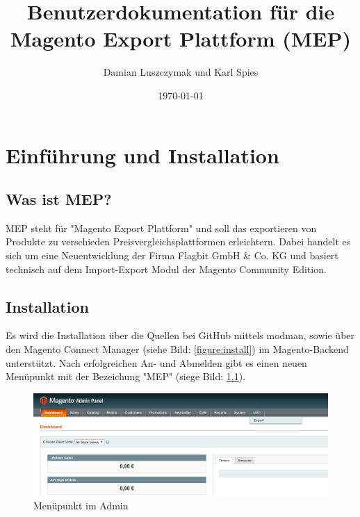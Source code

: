 \documentclass[a4paper,12pt]{book}
\author{Damian Luszczymak und Karl Spies}
\date{\today}
\title{Benutzerdokumentation für die Magento Export Plattform (MEP)}
\begin{document}
\maketitle

\tableofcontents
\listoffigures

\pagestyle{headings}

\chapter{Einführung und Installation}

\section{Was ist MEP?}
\label{sec:mep}

MEP steht für "Magento Export Plattform" und soll das exportieren von
Produkte zu verschieden Preisvergleichsplattformen erleichtern. Dabei
handelt es sich um eine Neuentwicklung der Firma Flagbit GmbH \& Co. KG
und basiert technisch auf dem Import-Export Modul der Magento Community Edition.

\section{Installation}
\label{sec:install}

Es wird die Installation über die Quellen bei GitHub mittels
modman, sowie über den Magento Connect Manager (siehe Bild: 
\ref{figure:install}) im Magento-Backend unterstützt.  Nach 
erfolgreichen An- und Abmelden gibt es einen neuen Menüpunkt mit der 
Bezeichung "MEP" (siege Bild: \ref{figure:admin_menu}).

\begin{figure}
 \includegraphics[width=1\textwidth]{img/bild01_1.png}
  \caption{Menüpunkt im Admin}
  \label{figure:admin_menu}
\end{figure}
\end{document}
